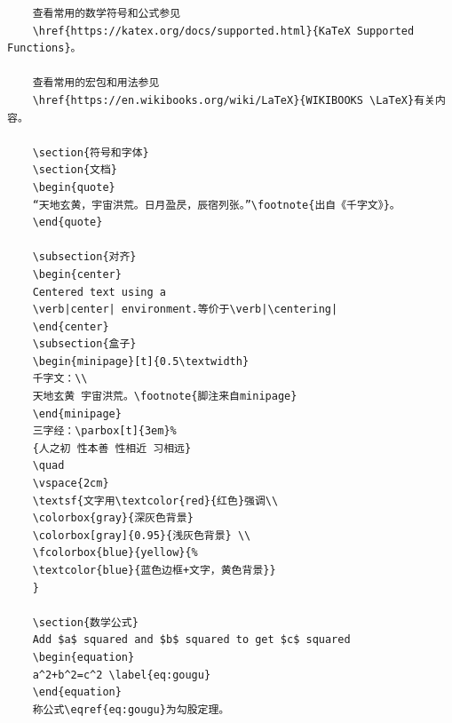 \documentclass[a4paper]{article} %
\numberwithin{equation}{section} %
\begin{document}
\begin{verbatim}
    查看常用的数学符号和公式参见
    \href{https://katex.org/docs/supported.html}{KaTeX Supported Functions}。
    
    查看常用的宏包和用法参见
    \href{https://en.wikibooks.org/wiki/LaTeX}{WIKIBOOKS \LaTeX}有关内容。
    
    \section{符号和字体}    
    \section{文档}
    \begin{quote}
    “天地玄黄，宇宙洪荒。日月盈昃，辰宿列张。”\footnote{出自《千字文》}。
    \end{quote}

    \subsection{对齐}
    \begin{center}
    Centered text using a
    \verb|center| environment.等价于\verb|\centering|
    \end{center}
    \subsection{盒子}
    \begin{minipage}[t]{0.5\textwidth}
    千字文：\\
    天地玄黄 宇宙洪荒。\footnote{脚注来自minipage}
    \end{minipage}
    三字经：\parbox[t]{3em}%
    {人之初 性本善 性相近 习相远}
    \quad
    \vspace{2cm}
    \textsf{文字用\textcolor{red}{红色}强调\\
    \colorbox{gray}{深灰色背景} 
    \colorbox[gray]{0.95}{浅灰色背景} \\
    \fcolorbox{blue}{yellow}{%
    \textcolor{blue}{蓝色边框+文字，黄色背景}}
    }
    
    \section{数学公式}
    Add $a$ squared and $b$ squared to get $c$ squared
    \begin{equation}
    a^2+b^2=c^2 \label{eq:gougu}
    \end{equation}
    称公式\eqref{eq:gougu}为勾股定理。
    

\end{verbatim}
\end{document}
